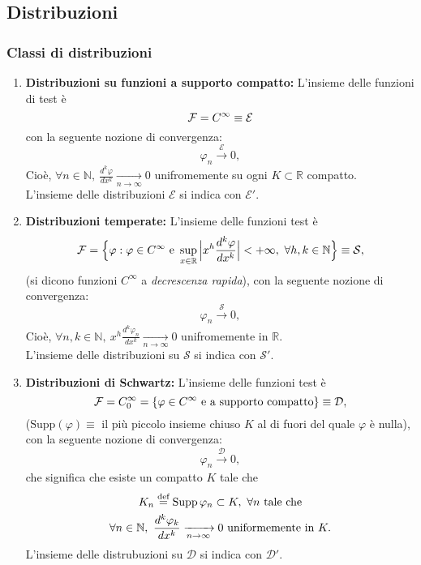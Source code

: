 \subsection*{Distribuzioni}
\subsubsection*{Classi di distribuzioni}
\begin{enumerate}
    \item \textbf{Distribuzioni su funzioni a supporto compatto:}
    L'insieme delle funzioni di test è
    \[
        \mathcal{F} = C^\infty \equiv \mathcal{E}
    \]
    con la seguente nozione di convergenza:
    \begin{equation*}
        \varphi_n\xrightarrow[]{\mathcal{E}}0,
    \end{equation*}
    Cioè, $\forall n \in \mathbb{N},\ \frac{d^k\varphi}{dx^k}\xrightarrow[n\to\infty]{}0$ unifromemente su ogni $K\subset\mathbb{R}$ compatto. \\
    L'insieme delle distribuzioni $\mathcal{E}$ si indica con $\mathcal{E}'$.
    \item \textbf{Distribuzioni temperate:}
    L'insieme delle funzioni test è
    \[
        \four = \Big\{ \varphi : \varphi \in C^\infty\text{ e } \sup_{x\in\mathbb{R}}\Big|x^h\frac{d^k\varphi}{dx^k}\Big|<+\infty,\ \forall h,k\in\mathbb{N}\Big\}\equiv\mathcal{S},
    \]
    (si dicono funzioni $C^\infty$ a \textit{decrescenza rapida}), con la seguente nozione di convergenza:
    \begin{equation*}
        \varphi_n\xrightarrow[]{\mathcal{S}}0,
    \end{equation*}
    Cioè, $\forall n,k \in \mathbb{N},\ x^h\frac{d^k\varphi_n}{dx^k}\xrightarrow[n\to\infty]{}0$ unifromemente in $\mathbb{R}$. \\
    L'insieme delle distribuzioni su $\mathcal{S}$ si indica con $\mathcal{S}'$.
    \item \textbf{Distribuzioni di Schwartz:}
    L'insieme delle funzioni test è
    \[
        \mathcal{F} = C_0^\infty=\{\varphi \in C^\infty\text{ e a supporto compatto}\} \equiv \mathcal{D},
    \]
    ($\text{Supp} (\varphi) \equiv$ il più piccolo insieme chiuso $K$ al di fuori del quale $\varphi$ è nulla), con la seguente nozione di convergenza:
    \begin{equation*}
        \varphi_n\xrightarrow[]{\mathcal{D}}0,
    \end{equation*}
    che significa che esiste un compatto $K$ tale che 
    \begin{gather*}
        K_n\defeq\text{Supp}\,\varphi_n\subset K,\ \forall n\text{ tale che}\\
        \forall n \in \mathbb{N},\ \frac{d^k\varphi_k}{dx^k}\xrightarrow[n\to\infty]{}0\text{ uniformemente in }K.
    \end{gather*}
    L'insieme delle distrubuzioni su $\mathcal{D}$ si indica con $\mathcal{D}'$.
\end{enumerate}



